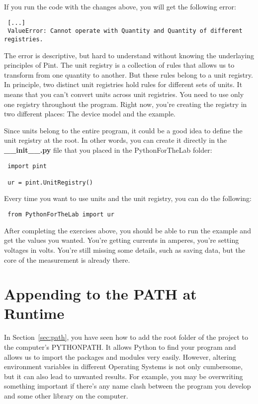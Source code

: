 If you run the code with the changes above, you will get the following error:

\begin{verbatim}
 [...]
 ValueError: Cannot operate with Quantity and Quantity of different registries.
\end{verbatim}

The error is descriptive, but hard to understand without knowing the underlaying principles of Pint. The unit registry is a collection of rules that allows us to transform from one quantity to another. But these rules belong to a unit registry. In principle, two distinct unit registries hold rules for different sets of units. It means that you can't convert units across unit registries. You need to use only one registry throughout the program. Right now, you're creating the registry in two different places: The device model and the example.

Since units belong to the entire program, it could be a good idea to define the unit registry at the root. In other words, you can create it directly in the \textbf{\_\_init\_\_.py} file that you placed in the PythonForTheLab folder:

\begin{verbatim}
 import pint

 ur = pint.UnitRegistry()
\end{verbatim}

Every time you want to use units and the unit registry, you can do the following:

\begin{verbatim}
 from PythonForTheLab import ur
\end{verbatim}



After completing the exercises above, you should be able to run the example and get the values you wanted. You're getting currents in amperes, you're setting voltages in volts. You're still missing some details, such as saving data, but the core of the measurement is already there.

\section{Appending to the PATH at Runtime}\label{sec:appending-path}
In Section~\ref{sec:path}, you have seen how to add the root folder of the project to the computer's PYTHONPATH. It allows Python to find your program and allows us to import the packages and modules very easily. However, altering environment variables in different Operating Systems is not only cumbersome, but it can also lead to unwanted results. For example, you may be overwriting something important if there's any name clash between the program you develop and some other library on the computer.

